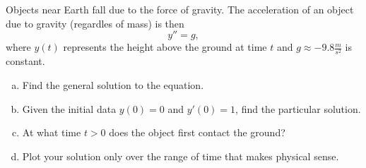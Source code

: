 \documentclass[12pt]{article} %
\begin{document}
\begin{problem}
Objects near Earth fall due to the force of gravity.  The acceleration of an object due to gravity (regardles of mass) is then
\[
y''=g,
\]
where $y(t)$ represents the height above the ground at time $t$ and $g\approx -9.8\frac{m}{s^2}$ is constant.  
\begin{enumerate}[(a)]
    \item Find the general solution to the equation.
    \item Given the initial data $y(0)=0$ and $y'(0)=1$, find the particular solution.
    \item At what time $t>0$ does the object first contact the ground?
    \item Plot your solution only over the range of time that makes physical sense. 
\end{enumerate}
\end{problem}
\end{document}

